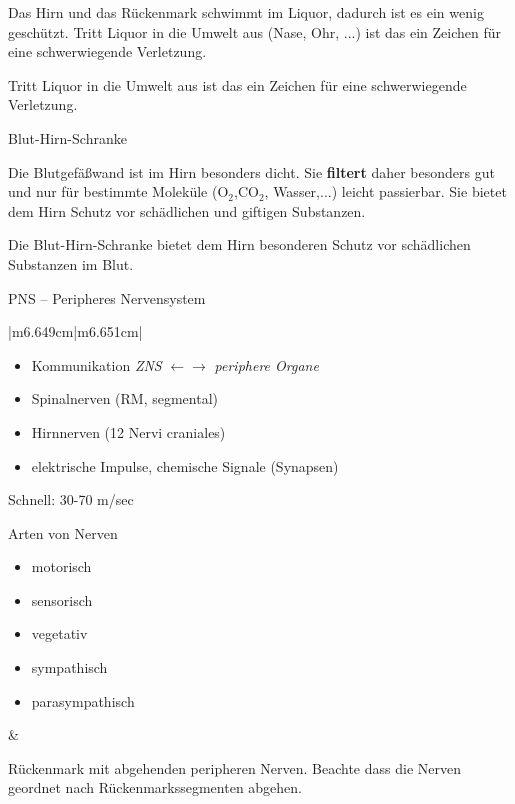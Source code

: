 \documentclass{article}
\newcommand\gSub[1]{\ensuremath{{}_{\text{#1}}}}
\newcommand\gEs[1]{\textbf{\textcolor[rgb]{0.0,0.0,0.5019608}{#1}}}
\newcommand\gEs[1]{\textbf{\textcolor[rgb]{0.0,0.0,0.5019608}{#1}}}
\begin{document}
{\mdseries
Das Hirn und das R\"uckenmark schwimmt im Liquor, dadurch ist es ein
wenig gesch\"utzt. Tritt Liquor in die Umwelt aus (Nase, Ohr, ...)  ist
das ein Zeichen f\"ur eine schwerwiegende Verletzung. }

{\mdseries
Tritt Liquor in die Umwelt aus ist das ein Zeichen f\"ur eine
schwerwiegende Verletzung. }

{\mdseries\color{black}
Blut-Hirn-Schranke }

{\mdseries
Die Blutgef\"a{\ss}wand ist im Hirn besonders dicht. Sie
\gEs{filtert} daher besonders gut und nur f\"ur
bestimmte Molek\"ule (O\gSub{2},CO\gSub{2},
Wasser,...) leicht passierbar. Sie bietet dem Hirn Schutz vor
sch\"adlichen und giftigen Substanzen. }

{\mdseries
Die Blut-Hirn-Schranke bietet dem Hirn besonderen Schutz vor
sch\"adlichen Substanzen im Blut. }

{\mdseries\color[rgb]{0.0,0.0,0.5019608}
PNS -- Peripheres Nervensystem}

\begin{center}
\tablehead{}\begin{supertabular}{|m{6.649cm}|m{6.651cm}|}
\hline
\begin{itemize}
\item Kommunikation \textit{ZNS} ${\leftarrow}$${\rightarrow}$
\textit{periphere  Organe}

\item Spinalnerven (RM, segmental)

\item Hirnnerven (12 Nervi craniales)

\item elektrische Impulse, chemische Signale (Synapsen)

\end{itemize}
Schnell: 30-70 m/sec

Arten von Nerven

\begin{itemize}
\item motorisch

\item sensorisch

\item vegetativ

\end{itemize}
\begin{itemize}
\item sympathisch

\item parasympathisch

\end{itemize}
 &
{%
 \par}

{\mdseries\upshape R\"uckenmark mit abgehenden peripheren Nerven.
Beachte dass die Nerven geordnet nach R\"uckenmarkssegmenten abgehen. }

\\\hline
\end{supertabular}
\end{center}
\end{document}
